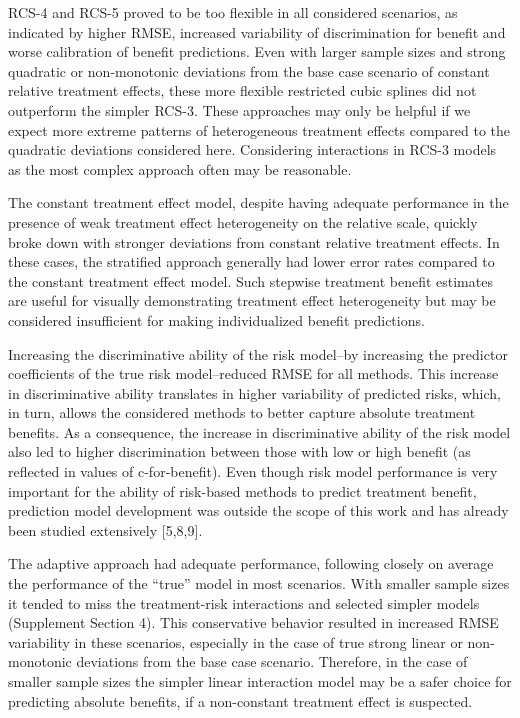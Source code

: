 \documentclass[]{elsarticle} %
\begin{document}
RCS-4 and RCS-5 proved to be too flexible in all considered scenarios,
as indicated by higher RMSE, increased variability of discrimination for
benefit and worse calibration of benefit predictions. Even with larger
sample sizes and strong quadratic or non-monotonic deviations from the
base case scenario of constant relative treatment effects, these more
flexible restricted cubic splines did not outperform the simpler RCS-3.
These approaches may only be helpful if we expect more extreme patterns
of heterogeneous treatment effects compared to the quadratic deviations
considered here. Considering interactions in RCS-3 models as the most
complex approach often may be reasonable.

The constant treatment effect model, despite having adequate performance
in the presence of weak treatment effect heterogeneity on the relative
scale, quickly broke down with stronger deviations from constant
relative treatment effects. In these cases, the stratified approach
generally had lower error rates compared to the constant treatment
effect model. Such stepwise treatment benefit estimates are useful for
visually demonstrating treatment effect heterogeneity but may be
considered insufficient for making individualized benefit predictions.

Increasing the discriminative ability of the risk model--by increasing
the predictor coefficients of the true risk model--reduced RMSE for all
methods. This increase in discriminative ability translates in higher
variability of predicted risks, which, in turn, allows the considered
methods to better capture absolute treatment benefits. As a consequence,
the increase in discriminative ability of the risk model also led to
higher discrimination between those with low or high benefit (as
reflected in values of c-for-benefit). Even though risk model
performance is very important for the ability of risk-based methods to
predict treatment benefit, prediction model development was outside the
scope of this work and has already been studied extensively {[}5,8,9{]}.

The adaptive approach had adequate performance, following closely on
average the performance of the ``true'' model in most scenarios. With
smaller sample sizes it tended to miss the treatment-risk interactions
and selected simpler models (Supplement Section 4). This conservative
behavior resulted in increased RMSE variability in these scenarios,
especially in the case of true strong linear or non-monotonic deviations
from the base case scenario. Therefore, in the case of smaller sample
sizes the simpler linear interaction model may be a safer choice for
predicting absolute benefits, if a non-constant treatment effect is
suspected.
\end{document}
